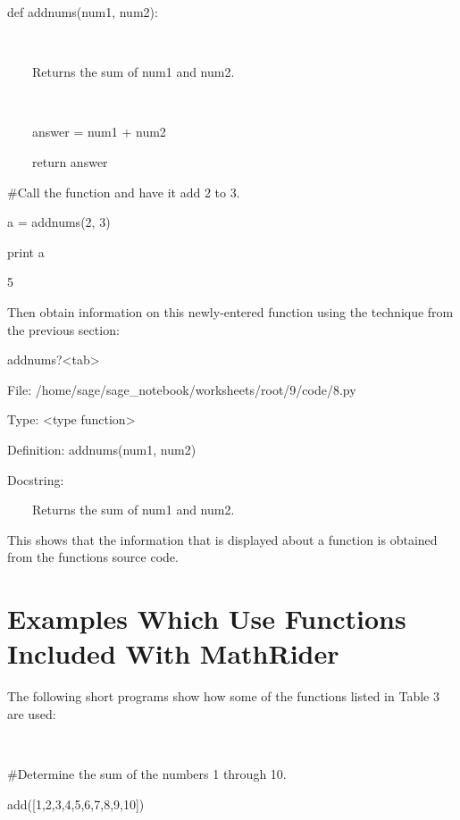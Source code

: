 \documentclass[12pt,twoside]{book}
\begin{document}
def addnums(num1, num2):

\ \ \ \ {\textquotedbl}{\textquotedbl}{\textquotedbl}

\ \ \ \ Returns the sum of num1 and num2.

\ \ \ \ {\textquotedbl}{\textquotedbl}{\textquotedbl}

\ \ \ \ answer = num1 + num2

\ \ \ \ return answer


\bigskip

\#Call the function and have it add 2 to 3.

a = addnums(2, 3)

print a

{\textbar}

5


\bigskip

Then obtain information on this newly{}-entered function using the
technique from the previous section:


\bigskip

addnums?{\textless}tab{\textgreater}

{\textbar}

File: /home/sage/sage\_notebook/worksheets/root/9/code/8.py   

Type: {\textless}type
{\textquotesingle}function{\textquotesingle}{\textgreater}          

Definition: addnums(num1, num2)        

Docstring:            

              

\ \ \ \ Returns the sum of num1 and num2.       


\bigskip

This shows that the information that is displayed about a function is
obtained from the function{\textquotesingle}s source code.

\section[Examples Which Use Functions Included With MathRider]{
Examples Which Use Functions Included With MathRider}

The following short programs show how some of the functions listed in
Table 3 are used:

\ 

\#Determine the sum of the numbers 1 through 10.

add([1,2,3,4,5,6,7,8,9,10])

{\textbar}
\end{document}
